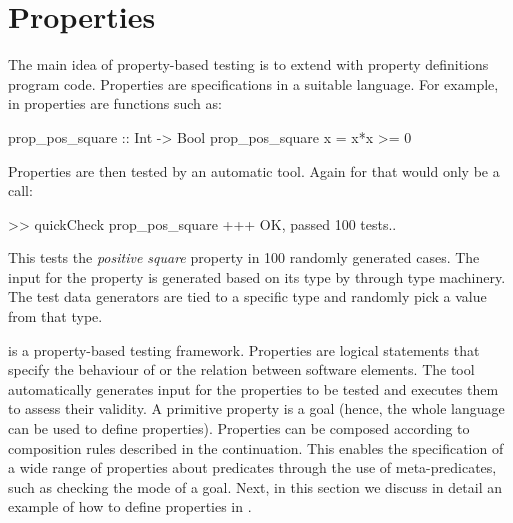 

\section{Properties}
\label{sec:properties}

The main idea of property-based testing is to extend with property definitions
program code.
%
Properties are specifications in a suitable language.
%
For example, in \QuickCheck{} properties are \Haskell{} functions such as:
%
\begin{code}
 prop_pos_square :: Int -> Bool
 prop_pos_square x = x*x >= 0
\end{code}

Properties are then tested by an automatic tool.
%
Again for \Haskell{} \QuickCheck{} that would only be a call:
%
\begin{code}
 >> quickCheck prop_pos_square
 +++ OK, passed 100 tests..
\end{code}
%
This tests the \emph{positive square} property in 100 randomly
generated cases.
%
The input for the property is generated based on its type by
\QuickCheck{} through type machinery.
%
The test data generators are tied to a specific type and randomly pick a
value from that type.


\plqc{} is a property-based testing framework.
%
Properties are logical statements that specify the behaviour of or the relation between software
elements.
%
The tool automatically generates input for the properties to be tested
and executes them to assess their validity.
%
A primitive property is a%
\Prolog{} goal (hence, the whole
language can be used to define properties).
%
Properties can be composed according to composition
rules described in the continuation.
%
%
%
%
This enables the specification of a wide range of properties about
predicates through the use of meta-predicates, such as checking
the mode of a goal. %
%
Next, in this section we discuss in detail an example of how to define
properties in \plqc{}.


